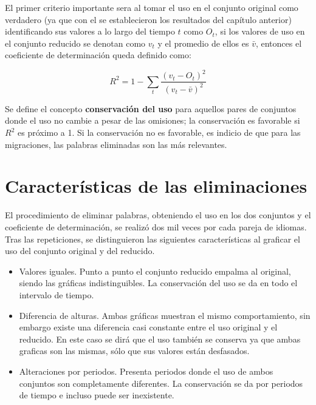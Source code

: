 El primer criterio importante sera al tomar el uso en el conjunto original como verdadero (ya que con el se establecieron los resultados del capítulo anterior) identificando sus valores a lo largo del tiempo $t$ como $O_{t}$, si los valores de uso en el conjunto reducido se denotan como  $v_{t}$ y el promedio de ellos es $\bar{v}$, entonces   el coeficiente de determinación queda definido como:

\begin{equation}
\label{ec.dif_uso}
R^{2} = 1 - \sum_{t} \frac{ \left( v_{t}- O_{t} \right)^{2}  }{ \left( v_{t} - \bar{v} \right)^{2} }
\end{equation}

Se define el concepto \textbf{conservación del uso} para aquellos pares de conjuntos donde el uso no cambie a pesar de las omisiones; la conservación es favorable si $R^{2}$ es próximo a 1.  Si la conservación no es favorable, es indicio de que para las migraciones, las palabras eliminadas son las más relevantes.

\section{Características de las eliminaciones}

El procedimiento de eliminar palabras, obteniendo el uso en los dos conjuntos y el coeficiente de determinación, se realizó dos mil veces por cada pareja de idiomas.  Tras las repeticiones, se distinguieron las siguientes características al graficar el uso del conjunto original y del reducido. 


\begin{itemize}
	
	\item Valores iguales. Punto a punto el conjunto reducido empalma al original, siendo las gráficas indistinguibles. La conservación del uso se da en todo el intervalo de tiempo. 
	
	\item Diferencia de alturas. Ambas gráficas muestran el mismo comportamiento, sin embargo existe una diferencia casi constante entre el uso original y el reducido. En este caso se dirá que el uso también se conserva ya que ambas graficas son las mismas, sólo que sus valores están desfasados. 
	
	\item Alteraciones por periodos.  Presenta periodos donde el uso de ambos conjuntos son completamente diferentes. La conservación se da por periodos de tiempo e incluso puede ser inexistente.
	
	
\end{itemize}

